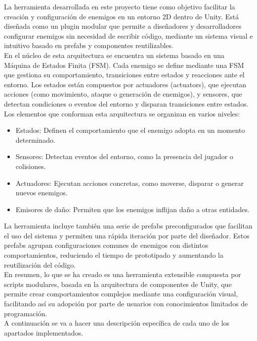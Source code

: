 La herramienta desarrollada en este proyecto tiene como objetivo facilitar la creación y configuración de enemigos en un entorno 2D dentro de Unity. Está diseñada como un plugin modular que permite a diseñadores y desarrolladores configurar enemigos sin necesidad de escribir código, mediante un sistema visual e intuitivo basado en prefabs y componentes reutilizables.\\

En el núcleo de esta arquitectura se encuentra un sistema basado en una Máquina de Estados Finita (FSM). Cada enemigo se define mediante una FSM que gestiona su comportamiento, transiciones entre estados y reacciones ante el entorno. Los estados están compuestos por actuadores (actuators), que ejecutan acciones (como movimiento, ataque o generación de enemigos), y sensores, que detectan condiciones o eventos del entorno y disparan transiciones entre estados.\\

Los elementos que conforman esta arquitectura se organizan en varios niveles:
\begin{itemize}
	\item Estados: Definen el comportamiento que el enemigo adopta en un momento determinado.
	\item Sensores: Detectan eventos del entorno, como la presencia del jugador o colisiones.
	\item Actuadores: Ejecutan acciones concretas, como moverse, disparar o generar nuevos enemigos.
	\item Emisores de daño: Permiten que los enemigos inflijan daño a otras entidades.
\end{itemize}

La herramienta incluye también una serie de prefabs preconfigurados que facilitan el uso del sistema y permiten una rápida iteración por parte del diseñador. Estos prefabs agrupan configuraciones comunes de enemigos con distintos comportamientos, reduciendo el tiempo de prototipado y aumentando la reutilización del código.\\

En resumen, lo que se ha creado es una herramienta extensible compuesta por scripts modulares, basada en la arquitectura de componentes de Unity, que permite crear comportamientos complejos mediante una configuración visual, facilitando así su adopción por parte de usuarios con conocimientos limitados de programación.\\

A continuación se va a hacer una descripción específica de cada uno de los apartados implementados.


